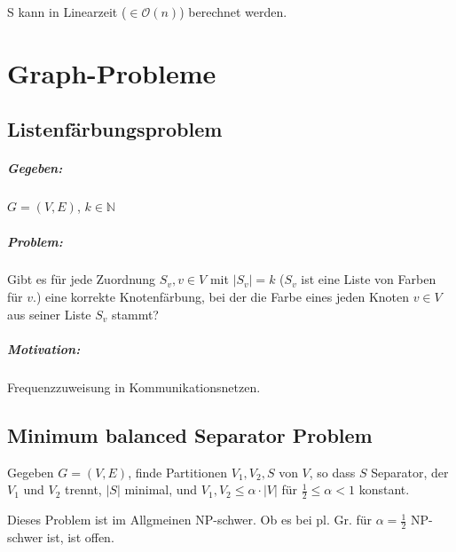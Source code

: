 \documentclass[a4paper,11pt]{report}
\begin{document}
S kann in Linearzeit ($\in \mathcal{O}(n)$) berechnet werden.




\chapter{Graph-Probleme}
\section{Listenfärbungsproblem}
\paragraph{Gegeben:} $G = (V, E)$, $k \in \mathbb{N}$

\paragraph{Problem:} Gibt es für jede Zuordnung $S_v, v \in V$ mit $|S_v| = k$ ($S_v$ ist eine Liste von Farben für $v$.) eine korrekte Knotenfärbung, bei der die Farbe eines jeden Knoten $v \in V$ aus seiner Liste $S_v$ stammt?

\paragraph{Motivation:} Frequenzzuweisung in Kommunikationsnetzen.


\section{Minimum balanced Separator Problem}
Gegeben $G = (V, E)$, finde Partitionen $V_1, V_2, S$ von $V$, so dass $S$ Separator, der $V_1$ und $V_2$ trennt, $|S|$ minimal, und $V_1, V_2 \leq \alpha \cdot |V|$ für $\frac{1}{2} \leq \alpha < 1$ konstant.

Dieses Problem ist im Allgmeinen NP-schwer. Ob es bei pl. Gr. für $\alpha = \frac{1}{2}$ NP-schwer ist, ist offen.
\end{document}
